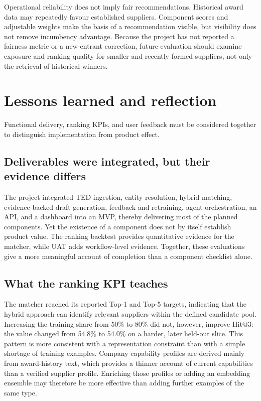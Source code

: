 \documentclass[10pt,a4paper]{article}
\begin{document}
Operational reliability does not imply fair recommendations. Historical award data may repeatedly favour established suppliers. Component scores and adjustable weights make the basis of a recommendation visible, but visibility does not remove incumbency advantage. Because the project has not reported a fairness metric or a new-entrant correction, future evaluation should examine exposure and ranking quality for smaller and recently formed suppliers, not only the retrieval of historical winners.

\section{Lessons learned and reflection}

Functional delivery, ranking KPIs, and user feedback must be considered together to distinguish implementation from product effect.

\subsection{Deliverables were integrated, but their evidence differs}
The project integrated TED ingestion, entity resolution, hybrid matching, evidence-backed draft generation, feedback and retraining, agent orchestration, an API, and a dashboard into an MVP, thereby delivering most of the planned components. Yet the existence of a component does not by itself establish product value. The ranking backtest provides quantitative evidence for the matcher, while UAT adds workflow-level evidence. Together, these evaluations give a more meaningful account of completion than a component checklist alone.

\subsection{What the ranking KPI teaches}
The matcher reached its reported Top-1 and Top-5 targets, indicating that the hybrid approach can identify relevant suppliers within the defined candidate pool. Increasing the training share from 50\% to 80\% did not, however, improve Hit@3: the value changed from 54.8\% to 54.0\% on a harder, later held-out slice. This pattern is more consistent with a representation constraint than with a simple shortage of training examples. Company capability profiles are derived mainly from award-history text, which provides a thinner account of current capabilities than a verified supplier profile. Enriching those profiles or adding an embedding ensemble may therefore be more effective than adding further examples of the same type.
\end{document}

